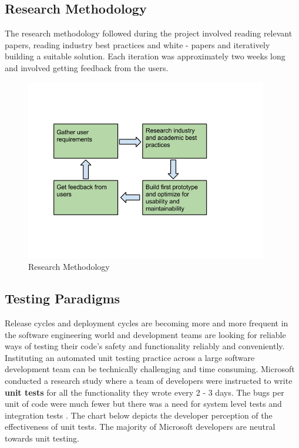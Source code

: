 \documentclass[12pt]{article}
\begin{document}
\subsection{Research Methodology}

The research methodology followed during the project involved reading relevant papers, reading industry best practices and white - papers and iteratively building a suitable solution. Each iteration was approximately two weeks long and involved getting feedback from the users.

\begin{figure}[H]
  \centering
    \includegraphics[height=300px]{figures/research.png}
  \caption{Research Methodology}
\end{figure}

\subsection{Testing Paradigms}
Release cycles and deployment cycles are becoming more and more frequent in the software engineering world and development teams are looking for reliable ways of testing their code's safety and functionality reliably and conveniently. Instituting an automated unit testing practice across a large software development team can be technically challenging and time consuming. Microsoft conducted a research study where a team of developers were instructed to write \textbf{unit tests} for all the functionality they wrote every 2 - 3 days. The bugs per unit of code were much fewer but there was a need for system level tests and integration tests \cite{unitTestingAtMicrosoft}. The chart below depicts the developer perception of the effectiveness of unit tests. The majority of Microsoft developers  are neutral towards unit testing.
\bigskip
\end{document}
